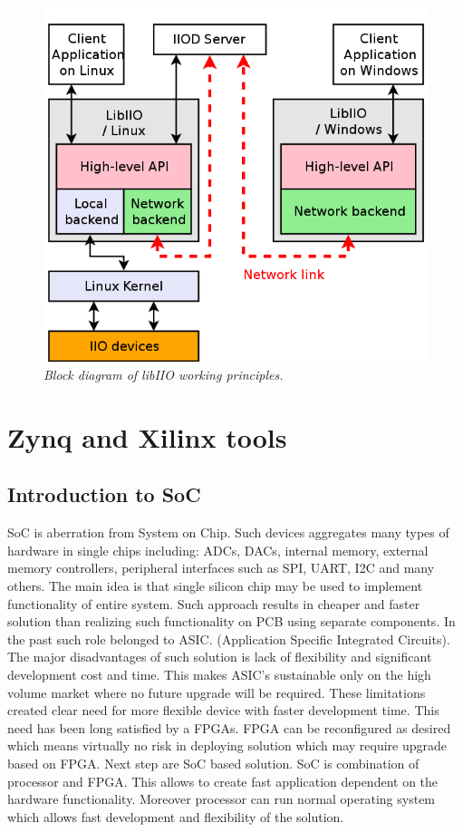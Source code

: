 \documentclass[en,printmode]{mgr}
\begin{document}
		
		\begin{figure}[!htb]
    		\centering
   			\includegraphics[width=\textwidth]{images/libiio_diagram.png}
   		 	\caption{\textit{Block diagram of libIIO working principles.}}
		\end{figure}
		
		\newpage
	\section{Zynq and Xilinx tools}
		\subsection*{Introduction to SoC}
		SoC is aberration from System on Chip. Such devices aggregates
		many types of hardware in single chips including: ADCs, DACs, internal memory, external 
		memory controllers, peripheral interfaces such as SPI, UART, I2C and many others. 
		The main idea is that single silicon chip may be
		used to implement functionality of entire system. Such approach results in cheaper and faster solution than
		realizing such functionality on PCB using separate components. In the past such role
		belonged to ASIC.
		(Application Specific Integrated Circuits). The major disadvantages of such solution is lack
		of flexibility and significant development cost and time. This makes ASIC's sustainable only
		on the high volume market where no future upgrade will be required. These limitations created
		clear need for more flexible device with faster development time. This need has been long
		satisfied by a FPGAs. FPGA can be reconfigured as desired which means virtually no risk in
		deploying solution which may require upgrade based on FPGA. Next step are SoC based solution.
		SoC is combination of processor and FPGA. This allows to create fast application dependent on the
		hardware functionality. Moreover processor can run normal operating system which allows fast
		development and flexibility of the solution.
		
\end{document}
